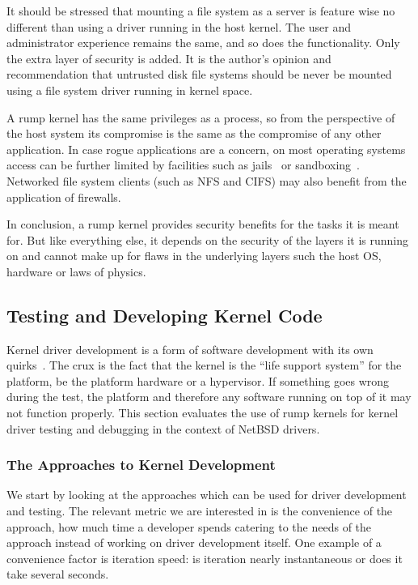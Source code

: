 It should be stressed that mounting a file system as a server is
feature wise no different than using a driver running in the host
kernel.  The user and administrator experience remains the same,
and so does the functionality.  Only the extra layer of security
is added.  It is the author's opinion and recommendation that
untrusted disk file systems should be never be mounted using a
file system driver running in kernel space.

A rump kernel has the same privileges as a process, so from the
perspective of the host system its compromise is the same as the
compromise of any other application.  In case rogue applications
are a concern, on most operating systems access can be
further limited by facilities such as jails~\cite{phk:jails} or
sandboxing~\cite{ford:vx32}.  Networked file system clients (such
as NFS and CIFS) may also benefit from the application of firewalls.

In conclusion, a rump kernel provides security benefits for the
tasks it is meant for.  But like everything else, it depends on
the security of the layers it is running on and cannot make up for
flaws in the underlying layers such the host OS, hardware or laws
of physics.

\subsection{Testing and Developing Kernel Code}
\label{sect:testing}

Kernel driver development is a form of software development with
its own quirks~\cite{lehey:debugging}.  The crux is the fact that
the kernel is the ``life support system'' for the platform, be the
platform hardware or a hypervisor.  If something goes wrong during
the test, the platform and therefore any software running on top
of it may not function properly.  This section evaluates the use
of rump kernels for kernel driver testing and debugging in the
context of NetBSD drivers.

\subsubsection{The Approaches to Kernel Development}

We start by looking at the approaches which can be used for driver
development and testing.  The relevant metric we are interested in
is the convenience of the approach, \ie how much time a developer
spends catering to the needs of the approach instead of working on
driver development itself.  One example of a convenience factor is
iteration speed: is iteration nearly instantaneous or does it take
several seconds.

